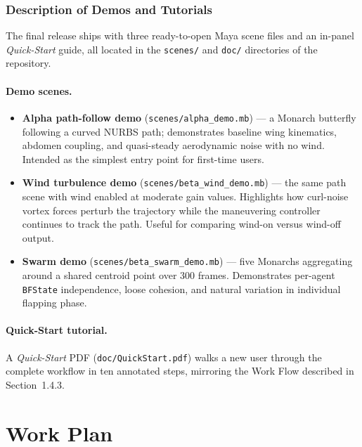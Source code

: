 \documentclass[12pt]{article}
\begin{document}
\subsubsection{Description of Demos and Tutorials}

The final release ships with three ready-to-open Maya scene files and an
in-panel \textit{Quick-Start} guide, all located in the \texttt{scenes/} and
\texttt{doc/} directories of the repository.

\paragraph{Demo scenes.}
\begin{itemize}
  \item \textbf{Alpha path-follow demo} (\texttt{scenes/alpha\_demo.mb}) ---
    a Monarch butterfly following a curved NURBS path; demonstrates baseline wing
    kinematics, abdomen coupling, and quasi-steady aerodynamic noise with no wind.
    Intended as the simplest entry point for first-time users.

  \item \textbf{Wind turbulence demo} (\texttt{scenes/beta\_wind\_demo.mb}) ---
    the same path scene with wind enabled at moderate gain values. Highlights how
    curl-noise vortex forces perturb the trajectory while the maneuvering controller
    continues to track the path. Useful for comparing wind-on versus wind-off output.

  \item \textbf{Swarm demo} (\texttt{scenes/beta\_swarm\_demo.mb}) ---
    five Monarchs aggregating around a shared centroid point over 300 frames.
    Demonstrates per-agent \texttt{BFState} independence, loose cohesion, and
    natural variation in individual flapping phase.
\end{itemize}

\paragraph{Quick-Start tutorial.}
A \textit{Quick-Start} PDF (\texttt{doc/QuickStart.pdf}) walks a new user through
the complete workflow in ten annotated steps, mirroring the Work Flow described in
Section~1.4.3.

\newpage

\section{Work Plan}
\end{document}
